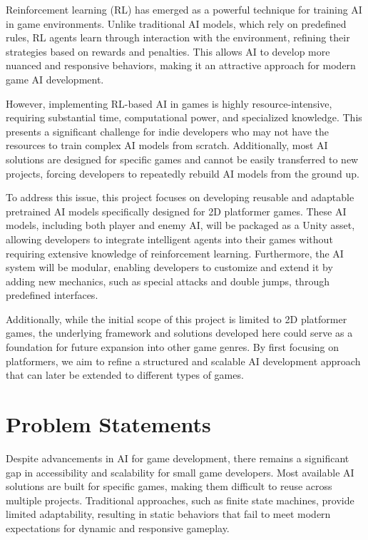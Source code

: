 \documentclass[12pt,oneside,openright,a4paper]{cpe-english-project}
\begin{document}
Reinforcement learning (RL) has emerged as a powerful technique for training AI in game environments. Unlike traditional AI models, which rely on predefined rules, RL agents learn through interaction with the environment, refining their strategies based on rewards and penalties. This allows AI to develop more nuanced and responsive behaviors, making it an attractive approach for modern game AI development.\par

However, implementing RL-based AI in games is highly resource-intensive, requiring substantial time, computational power, and specialized knowledge. This presents a significant challenge for indie developers who may not have the resources to train complex AI models from scratch. Additionally, most AI solutions are designed for specific games and cannot be easily transferred to new projects, forcing developers to repeatedly rebuild AI models from the ground up.\par

To address this issue, this project focuses on developing reusable and adaptable pretrained AI models specifically designed for 2D platformer games. These AI models, including both player and enemy AI, will be packaged as a Unity asset, allowing developers to integrate intelligent agents into their games without requiring extensive knowledge of reinforcement learning. Furthermore, the AI system will be modular, enabling developers to customize and extend it by adding new mechanics, such as special attacks and double jumps, through predefined interfaces.\par

Additionally, while the initial scope of this project is limited to 2D platformer games, the underlying framework and solutions developed here could serve as a foundation for future expansion into other game genres. By first focusing on platformers, we aim to refine a structured and scalable AI development approach that can later be extended to different types of games.\par

\section{Problem Statements}

Despite advancements in AI for game development, there remains a significant gap in accessibility and scalability for small game developers. Most available AI solutions are built for specific games, making them difficult to reuse across multiple projects. Traditional approaches, such as finite state machines, provide limited adaptability, resulting in static behaviors that fail to meet modern expectations for dynamic and responsive gameplay.\par
\end{document}
